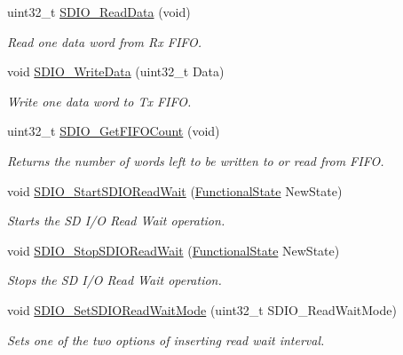 \begin{DoxyCompactItemize}
uint32\+\_\+t \mbox{\hyperlink{group___s_d_i_o___exported___functions_ga4e8ac755ef3c31ecd4ed2708df19187e}{S\+D\+I\+O\+\_\+\+Read\+Data}} (void)
\begin{DoxyCompactList}\small\item\em Read one data word from Rx F\+I\+FO. \end{DoxyCompactList}\item 
void \mbox{\hyperlink{group___s_d_i_o___exported___functions_ga361008b5252aa33b5f2b5823ee3d7240}{S\+D\+I\+O\+\_\+\+Write\+Data}} (uint32\+\_\+t Data)
\begin{DoxyCompactList}\small\item\em Write one data word to Tx F\+I\+FO. \end{DoxyCompactList}\item 
uint32\+\_\+t \mbox{\hyperlink{group___s_d_i_o___exported___functions_ga9a3343983a2d68b5164a1c89797d2dd6}{S\+D\+I\+O\+\_\+\+Get\+F\+I\+F\+O\+Count}} (void)
\begin{DoxyCompactList}\small\item\em Returns the number of words left to be written to or read from F\+I\+FO. \end{DoxyCompactList}\item 
void \mbox{\hyperlink{group___s_d_i_o___exported___functions_gac88f914d9a68a83abc2265ec8a7b79fc}{S\+D\+I\+O\+\_\+\+Start\+S\+D\+I\+O\+Read\+Wait}} (\mbox{\hyperlink{group___exported__types_gac9a7e9a35d2513ec15c3b537aaa4fba1}{Functional\+State}} New\+State)
\begin{DoxyCompactList}\small\item\em Starts the SD I/O Read Wait operation. \end{DoxyCompactList}\item 
void \mbox{\hyperlink{group___s_d_i_o___exported___functions_gaca6b25eb2debb73ac827c66f0ebcf837}{S\+D\+I\+O\+\_\+\+Stop\+S\+D\+I\+O\+Read\+Wait}} (\mbox{\hyperlink{group___exported__types_gac9a7e9a35d2513ec15c3b537aaa4fba1}{Functional\+State}} New\+State)
\begin{DoxyCompactList}\small\item\em Stops the SD I/O Read Wait operation. \end{DoxyCompactList}\item 
void \mbox{\hyperlink{group___s_d_i_o___exported___functions_ga2baac4ea1bb6c2d94345d2712604338a}{S\+D\+I\+O\+\_\+\+Set\+S\+D\+I\+O\+Read\+Wait\+Mode}} (uint32\+\_\+t S\+D\+I\+O\+\_\+\+Read\+Wait\+Mode)
\begin{DoxyCompactList}\small\item\em Sets one of the two options of inserting read wait interval. \end{DoxyCompactList}\item 

\end{DoxyCompactItemize}
